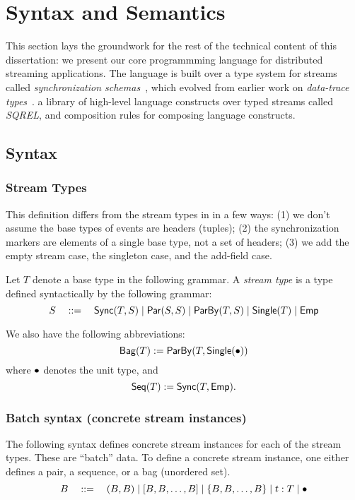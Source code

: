 \section{Syntax and Semantics}

This section lays the groundwork for the rest of the technical content of this dissertation: we present our core programmming language for distributed streaming applications. The language is built over a type system for streams called \emph{synchronization schemas}~, which evolved from earlier work on \emph{data-trace types}~. a library of high-level language constructs over typed streams called \emph{SQREL}, and composition rules for composing language constructs.
\cite{StreamQRE}

\subsection{Syntax}

\subsubsection{Stream Types}

This definition differs from the stream types in  in a few ways: (1) we don't assume the base types of events are headers (tuples); (2) the synchronization markers are elements of a single base type, not a set of headers; (3) we add the empty stream case, the singleton case, and the add-field case.

\begin{definition}
Let $T$ denote a base type in the following grammar.
A \emph{stream type} is a type defined syntactically by the following grammar:
\[
  S \quad ::= \quad
    \mathsf{Sync}({T}, S) \mid
    \mathsf{Par}({S}, {S}) \mid
    \mathsf{ParBy}({T}, S) \mid
    \mathsf{Single}(T) \mid
    \mathsf{Emp}{}
\]
\end{definition}

We also have the following abbreviations:
\[
  \mathsf{Bag}({T}) := \mathsf{ParBy}({T}, \mathsf{Single}(\bullet{}))
\]
where $\bullet{}$ denotes the unit type, and
\[
  \mathsf{Seq}({T}) := \mathsf{Sync}({T}, \mathsf{Emp}{}).
\]

\subsubsection{Batch syntax (concrete stream instances)}

The following syntax defines concrete stream instances for each of the
stream types.
These are ``batch'' data.
To define a concrete stream instance, one either defines a pair, a sequence, or a bag (unordered set).
\[
  B \quad ::= \quad
    (B, B) \mid
    [B, B, \ldots, B] \mid
    \{B, B, \ldots, B\} \mid
    t: T \mid
    \bullet{}
\]

